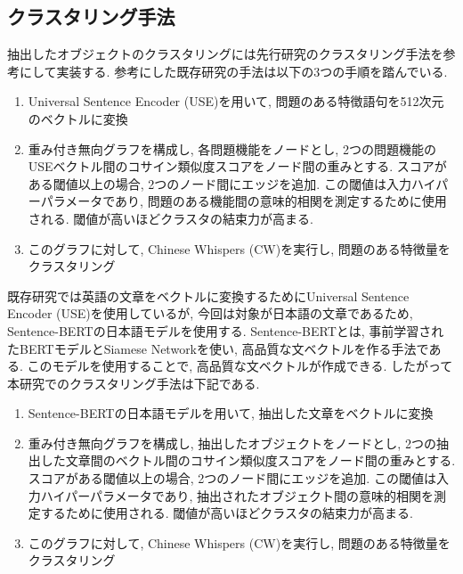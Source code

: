 \subsection{クラスタリング手法}
抽出したオブジェクトのクラスタリングには先行研究のクラスタリング手法\cite{sira}を参考にして実装する. 参考にした既存研究の手法は以下の3つの手順を踏んでいる. 
\begin{enumerate}
  \item Universal Sentence Encoder (USE)を用いて, 問題のある特徴語句を512次元のベクトルに変換
  \item 重み付き無向グラフを構成し, 各問題機能をノードとし, 2つの問題機能のUSEベクトル間のコサイン類似度スコアをノード間の重みとする. スコアがある閾値以上の場合, 2つのノード間にエッジを追加. この閾値は入力ハイパーパラメータであり, 問題のある機能間の意味的相関を測定するために使用される. 閾値が高いほどクラスタの結束力が高まる. 
  \item このグラフに対して, Chinese Whispers (CW)を実行し, 問題のある特徴量をクラスタリング
\end{enumerate}

既存研究では英語の文章をベクトルに変換するためにUniversal Sentence Encoder (USE)を使用しているが, 今回は対象が日本語の文章であるため, Sentence-BERTの日本語モデルを使用する. Sentence-BERT\cite{sentence-bert}とは, 事前学習されたBERTモデルとSiamese Networkを使い, 高品質な文ベクトルを作る手法である. このモデルを使用することで, 高品質な文ベクトルが作成できる. 
したがって本研究でのクラスタリング手法は下記である. 
\begin{enumerate}
  \item Sentence-BERTの日本語モデルを用いて, 抽出した文章をベクトルに変換
  \item 重み付き無向グラフを構成し, 抽出したオブジェクトをノードとし, 2つの抽出した文章間のベクトル間のコサイン類似度スコアをノード間の重みとする. スコアがある閾値以上の場合, 2つのノード間にエッジを追加. この閾値は入力ハイパーパラメータであり, 抽出されたオブジェクト間の意味的相関を測定するために使用される. 閾値が高いほどクラスタの結束力が高まる. 
  \item このグラフに対して, Chinese Whispers (CW)を実行し, 問題のある特徴量をクラスタリング
\end{enumerate}

